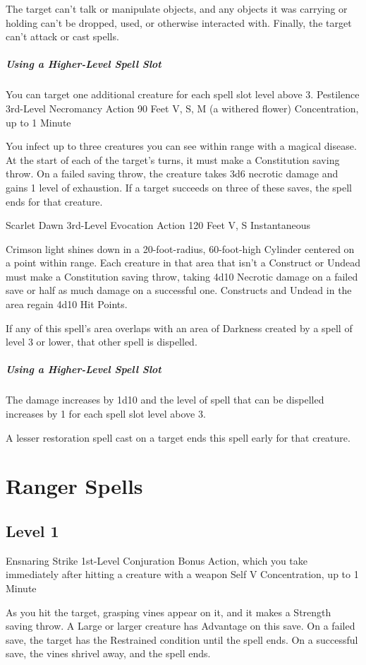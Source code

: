 \documentclass[letterpaper,openany,oneside,twocolumn]{book}
\begin{document}
The target can't talk or manipulate objects, and any objects it was carrying or holding can't be dropped, used, or otherwise interacted with. Finally, the target can't attack or cast spells.

\subparagraph*{Using a Higher-Level Spell Slot} You can target one additional creature for each spell slot level above 3.
\DndSpellHeader
  {Pestilence}
  {3rd-Level Necromancy}
  {Action}
  {90 Feet}
  {V, S, M (a withered flower)}
  {Concentration, up to 1 Minute}

You infect up to three creatures you can see within range with a magical disease. At the start of each of the target's turns, it must make a Constitution saving throw. On a failed saving throw, the creature takes 3d6 necrotic damage and gains 1 level of exhaustion. If a target succeeds on three of these saves, the spell ends for that creature.

\DndSpellHeader
  {Scarlet Dawn}
  {3rd-Level Evocation}
  {Action}
  {120 Feet}
  {V, S}
  {Instantaneous}

Crimson light shines down in a 20-foot-radius, 60-foot-high Cylinder centered on a point within range. Each creature in that area that isn't a Construct or Undead must make a Constitution saving throw, taking 4d10 Necrotic damage on a failed save or half as much damage on a successful one. Constructs and Undead in the area regain 4d10 Hit Points.

If any of this spell's area overlaps with an area of Darkness created by a spell of level 3 or lower, that other spell is dispelled.

\subparagraph*{Using a Higher-Level Spell Slot} The damage increases by 1d10 and the level of spell that can be dispelled increases by 1 for each spell slot level above 3.

A lesser restoration spell cast on a target ends this spell early for that creature.
\clearpage
\section*{Ranger Spells}
\subsection*{Level 1}
\DndSpellHeader
  {Ensnaring Strike}
  {1st-Level Conjuration}
  {Bonus Action, which you take immediately after hitting a creature with a weapon}
  {Self}
  {V}
  {Concentration, up to 1 Minute}
  
As you hit the target, grasping vines appear on it, and it makes a Strength saving throw. A Large or larger creature has Advantage on this save. On a failed save, the target has the Restrained condition until the spell ends. On a successful save, the vines shrivel away, and the spell ends.
\end{document}
